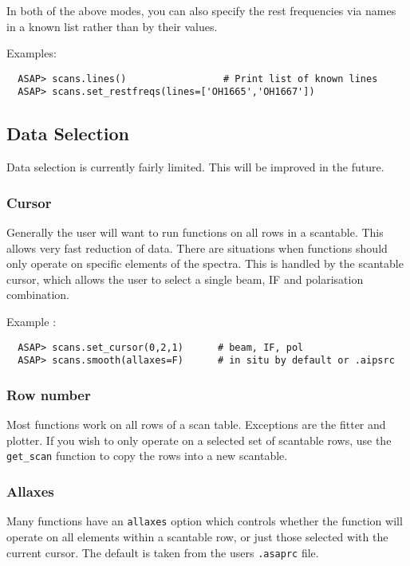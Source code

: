 \documentclass[11pt]{article}
\newcommand{\cmd}[1]{{\tt #1}}
\begin{document}
In both of the above modes, you can also specify the rest frequencies via
names in a known list rather than by their values.

Examples:

\begin{verbatim}
  ASAP> scans.lines()                 # Print list of known lines
  ASAP> scans.set_restfreqs(lines=['OH1665','OH1667'])
\end{verbatim}

  

\subsection{Data Selection}

Data selection is currently fairly limited. This will be improved in
the future. 


\subsubsection{Cursor}

Generally the user will want to run functions on all rows in a
scantable. This allows very fast reduction of data. There are situations
when functions should only operate on specific elements of the spectra. This
is handled by the scantable cursor, which allows the user to select a
single beam, IF and polarisation combination.

Example :

\begin{verbatim}
  ASAP> scans.set_cursor(0,2,1)      # beam, IF, pol
  ASAP> scans.smooth(allaxes=F)      # in situ by default or .aipsrc
\end{verbatim}

\subsubsection{Row number}

Most functions work on all rows of a scan table. Exceptions are the
fitter and plotter. If you wish to only operate on a selected set of
scantable rows, use the \cmd{get\_scan} function to copy the rows into
a new scantable.

\subsubsection{Allaxes}

Many functions have an \cmd{allaxes} option which controls whether the
function will operate on all elements within a scantable row, or just
those selected with the current cursor. The default is taken from the
users {\tt .asaprc} file.
\end{document}
